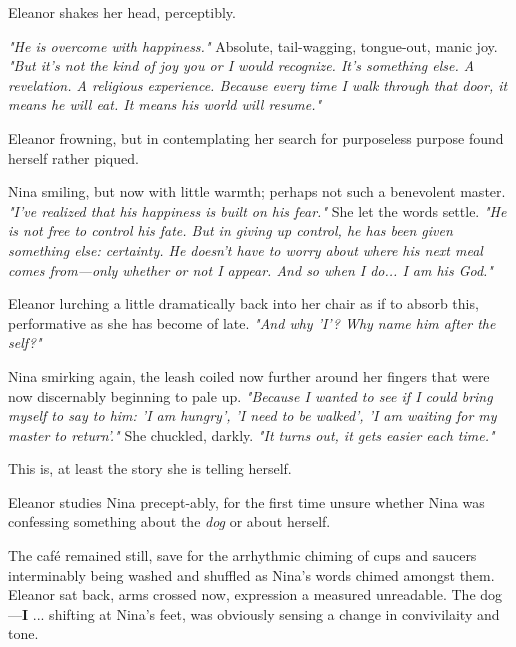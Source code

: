 \smallskip

Eleanor shakes her head, perceptibly.

\smallskip

\textit{"He is overcome with happiness."} Absolute, tail-wagging, tongue-out, manic joy. \textit{"But it's not the kind of joy you or I would recognize. It's something else. A revelation. A religious experience. Because every time I walk through that door, it means he will eat. It means his world will resume."}  

Eleanor frowning, but in contemplating her search for purposeless purpose found herself rather piqued.

\smallskip

Nina smiling, but now with little warmth; perhaps not such a benevolent master. \textit{"I've realized that his happiness is built on his fear."} She let the words settle. \textit{"He is not free to control his fate. But in giving up control, he has been given something else: certainty. He doesn’t have to worry about where his next meal comes from—only whether or not I appear. And so when I do... I am his God."}

\smallskip

Eleanor lurching a little dramatically back into her chair as if to absorb this, performative as she has become of late. \textit{"And why 'I'? Why name him after the self?"}

\smallskip

Nina smirking again, the leash coiled now further around her fingers that were now discernably beginning to pale up. \textit{"Because I wanted to see if I could bring myself to say to him: 'I am hungry', 'I need to be walked', 'I am waiting for my master to return'."} She chuckled, darkly. \textit{"It turns out, it gets easier each time."} 

\smallskip

This is, at least the story she is telling herself.

\smallskip

Eleanor studies Nina precept-ably, for the first time unsure whether Nina was confessing something about the \textit{dog} or about herself.

\smallskip

The café remained still, save for the arrhythmic chiming of cups and saucers interminably being washed and shuffled as Nina's words chimed amongst them.  Eleanor sat back, arms crossed now, expression a measured unreadable. The dog—\textbf{I} ... shifting at Nina’s feet, was obviously sensing a change in convivilaity and tone.  

